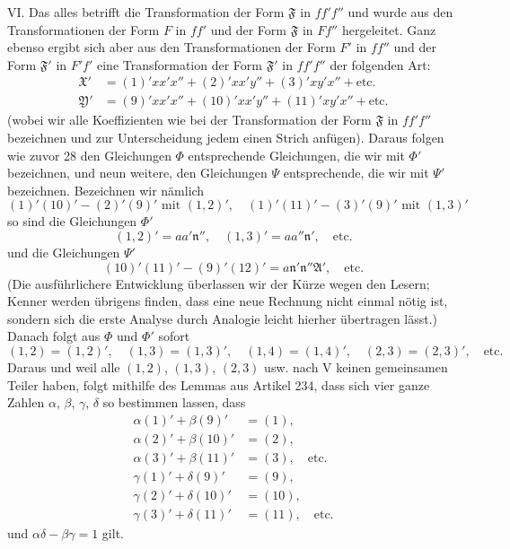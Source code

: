 VI. Das alles betrifft die Transformation der Form $\mathfrak{F}$ in $ff'f''$ und wurde aus den Transformationen der Form $F$ in $ff'$ und der Form $\mathfrak{F}$ in $Ff''$ hergeleitet. Ganz ebenso ergibt sich aber aus den Transformationen der Form $F'$ in $ff''$ und der Form $\mathfrak{F}'$ in $F'f'$ eine Transformation der Form $\mathfrak{F}'$ in $ff'f''$ der folgenden Art:
\[
\begin{aligned}
\mathfrak{X}'&=(1)'xx'x''+(2)'xx'y''+(3)'xy'x''+\text{etc.}\\
\mathfrak{Y}'&=(9)'xx'x''+(10)'xx'y''+(11)'xy'x''+\text{etc.}
\end{aligned}
\]
(wobei wir alle Koeffizienten wie bei der Transformation der Form $\mathfrak{F}$ in $ff'f''$ bezeichnen und zur Unterscheidung jedem einen Strich anfügen). Daraus folgen wie zuvor 28 den Gleichungen $\Phi$ entsprechende Gleichungen, die wir mit $\Phi'$ bezeichnen, und neun weitere, den Gleichungen $\Psi$ entsprechende, die wir mit $\Psi'$ bezeichnen. Bezeichnen wir nämlich
\[
(1)'(10)'-(2)'(9)'\text{ mit }(1,2)',\quad
(1)'(11)'-(3)'(9)'\text{ mit }(1,3)'
\]
so sind die Gleichungen $\Phi'$
\[
(1,2)'=aa'\mathfrak{n}'',\quad (1,3)'=aa''\mathfrak{n}',\quad\text{etc.}
\]
und die Gleichungen $\Psi'$
\[
(10)'(11)'-(9)'(12)'=a\mathfrak{n}'\mathfrak{n}''\mathfrak{A}',\quad\text{etc.}
\]
(Die ausführlichere Entwicklung überlassen wir der Kürze wegen den Lesern; Kenner werden übrigens finden, dass eine neue Rechnung nicht einmal nötig ist, sondern sich die erste Analyse durch Analogie leicht hierher übertragen lässt.) Danach folgt aus $\Phi$ und $\Phi'$ sofort
\[
(1,2)=(1,2)',\quad (1,3)=(1,3)',\quad (1,4)=(1,4)',\quad (2,3)=(2,3)',\quad\text{etc.}
\]
Daraus und weil alle $(1,2)$, $(1,3)$, $(2,3)$ usw. nach V keinen gemeinsamen Teiler haben, folgt mithilfe des Lemmas aus Artikel 234, dass sich vier ganze Zahlen $\alpha$, $\beta$, $\gamma$, $\delta$ so bestimmen lassen, dass
\[
\begin{aligned}
\alpha(1)'+\beta(9)'&=(1),\\\alpha(2)'+\beta(10)'&=(2),\\\alpha(3)'+\beta(11)'&=(3),\quad\text{etc.}\\
\gamma(1)'+\delta(9)'&=(9),\\\gamma(2)'+\delta(10)'&=(10),\\\gamma(3)'+\delta(11)'&=(11),\quad\text{etc.}
\end{aligned}
\]
und $\alpha\delta-\beta\gamma=1$ gilt.

